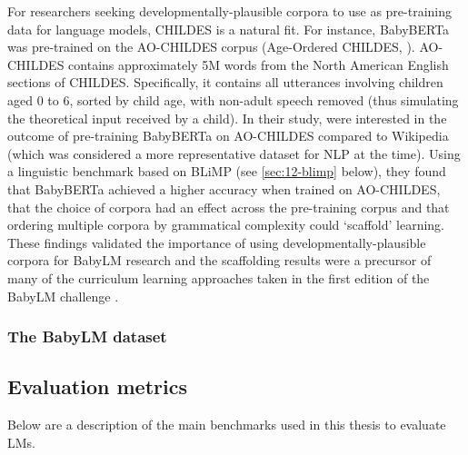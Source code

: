 For researchers seeking developmentally-plausible corpora to use as pre-training data for language models, CHILDES is a natural fit. For instance, BabyBERTa was pre-trained on the AO-CHILDES corpus (Age-Ordered CHILDES, \citep{huebner2021using}). AO-CHILDES contains approximately 5M words from the North American English sections of CHILDES. Specifically, it contains all utterances involving children aged 0 to 6, sorted by child age, with non-adult speech removed (thus simulating the theoretical input received by a child). In their study, \citet{huebner-etal-2021-babyberta} were interested in the outcome of pre-training BabyBERTa on AO-CHILDES compared to Wikipedia (which was considered a more representative dataset for NLP at the time). Using a linguistic benchmark based on BLiMP (see \cref{sec:12-blimp} below), they found that BabyBERTa achieved a higher accuracy when trained on AO-CHILDES, that the choice of corpora had an effect across the pre-training corpus and that ordering multiple corpora by grammatical complexity could `scaffold' learning. These findings validated the importance of using developmentally-plausible corpora for BabyLM research and the scaffolding results were a precursor of many of the curriculum learning approaches taken in the first edition of the BabyLM challenge \addcites.



\subsubsection{The BabyLM dataset}


\subsection{Evaluation metrics}

Below are a description of the main benchmarks used in this thesis to evaluate LMs. 

